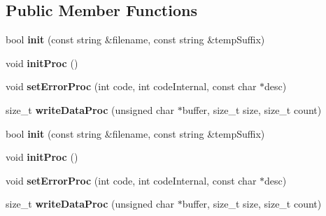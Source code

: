 \subsection*{Public Member Functions}
\begin{DoxyCompactItemize}
\item 
\mbox{\label{classcocos2d_1_1network_1_1DownloadTaskCURL_ac3069cfb73c389787d6167b602ad10f6}} 
bool {\bfseries init} (const string \&filename, const string \&temp\+Suffix)
\item 
\mbox{\label{classcocos2d_1_1network_1_1DownloadTaskCURL_a204a49f8f8618e3ea0941721e1055bae}} 
void {\bfseries init\+Proc} ()
\item 
\mbox{\label{classcocos2d_1_1network_1_1DownloadTaskCURL_a9645e034b010a0e23e341159109aa29c}} 
void {\bfseries set\+Error\+Proc} (int code, int code\+Internal, const char $\ast$desc)
\item 
\mbox{\label{classcocos2d_1_1network_1_1DownloadTaskCURL_ac3d665af8c59068c7b1dcaf6c03fe8de}} 
size\+\_\+t {\bfseries write\+Data\+Proc} (unsigned char $\ast$buffer, size\+\_\+t size, size\+\_\+t count)
\item 
\mbox{\label{classcocos2d_1_1network_1_1DownloadTaskCURL_ac3069cfb73c389787d6167b602ad10f6}} 
bool {\bfseries init} (const string \&filename, const string \&temp\+Suffix)
\item 
\mbox{\label{classcocos2d_1_1network_1_1DownloadTaskCURL_a204a49f8f8618e3ea0941721e1055bae}} 
void {\bfseries init\+Proc} ()
\item 
\mbox{\label{classcocos2d_1_1network_1_1DownloadTaskCURL_a9645e034b010a0e23e341159109aa29c}} 
void {\bfseries set\+Error\+Proc} (int code, int code\+Internal, const char $\ast$desc)
\item 
\mbox{\label{classcocos2d_1_1network_1_1DownloadTaskCURL_ac3d665af8c59068c7b1dcaf6c03fe8de}} 
size\+\_\+t {\bfseries write\+Data\+Proc} (unsigned char $\ast$buffer, size\+\_\+t size, size\+\_\+t count)
\end{DoxyCompactItemize}
